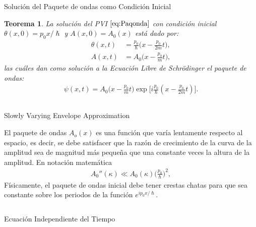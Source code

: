 \documentclass[aspectratio=1610]{beamer}
\newtheorem*{teo}{Teorema}
\begin{document}
\begin{frame}{Solución del Paquete de ondas como Condición Inicial}
   
\begin{teo}
    La solución del PVI $\eqref{eq:Paqonda}$ con condición inicial $\theta(x,0) = p_{0}x/\hslash$ y $A(x,0) = A_{0}(x)$ está dado por:
    \begin{align*}
        \theta(x,t) & = \frac{p_{0}}{\hslash}\bigg(x - \frac{p_{0}}{2m}t\bigg),
        \\
        A(x,t) & = A_{0}\bigg(x-\frac{p_{0}}{m}t\bigg),
    \end{align*}
    las cuáles dan como solución a la Ecuación Libre de Schrödinger el paquete de ondas:
    \begin{align}
        \psi(x,t) = A_{0}\bigg(x-\frac{p_{0}}{m}t\bigg)\exp\bigg[i\frac{p_{0}}{\hslash}(x - \frac{p_{0}}{2m}t)\bigg].
        \label{eq:Apoyo7}
    \end{align}
\end{teo}
    
\begin{columns}
\column{37em}
\end{columns}
\end{frame}

\begin{frame}{Slowly Varying Envelope Approximation}
 
El paquete de ondas $A_{o}(x)$ es una función que varía lentamente respecto al espacio, es decir, se debe satisfacer que la razón de crecimiento de la curva de la amplitud sea de magnitud más pequeña que una constante veces la altura de la amplitud. En notación matemática
\begin{align*} 
    A_{0}''(\kappa) \ll A_{0}(\kappa)\bigg(\frac{p_{0}}{\hslash}\bigg)^2,
    \end{align*}
Físicamente, el paquete de ondas inicial debe tener crestas chatas para que sea constante sobre los periodos de la función $e^{ip_{0}x/\hslash}$.
\end{frame}


\begin{frame}
\begin{columns}
\column{37em}
\vspace{1cm}
\Huge{\centerline{Ecuación Independiente del Tiempo}}
\end{columns}
\end{frame}
\end{document}
